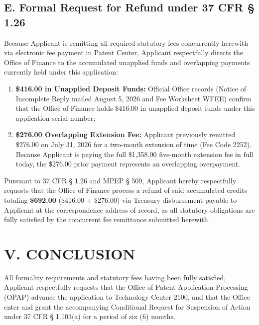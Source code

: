 \documentclass[11pt,letterpaper]{article}
\begin{document}
\subsection*{E. Formal Request for Refund under 37 CFR \S{} 1.26}
Because Applicant is remitting all required statutory fees concurrently herewith via electronic fee payment in Patent Center, Applicant respectfully directs the Office of Finance to the accumulated unapplied funds and overlapping payments currently held under this application:
\begin{enumerate}[leftmargin=*]
    \item \textbf{\$416.00 in Unapplied Deposit Funds:} Official Office records (Notice of Incomplete Reply mailed August 5, 2026 and Fee Worksheet WFEE) confirm that the Office of Finance holds \$416.00 in unapplied deposit funds under this application serial number;
    \item \textbf{\$276.00 Overlapping Extension Fee:} Applicant previously remitted \$276.00 on July 31, 2026 for a two-month extension of time (Fee Code 2252). Because Applicant is paying the full \$1,358.00 five-month extension fee in full today, the \$276.00 prior payment represents an overlapping overpayment.
\end{enumerate}

Pursuant to 37 CFR \S{} 1.26 and MPEP \S{} 509, Applicant hereby respectfully requests that the Office of Finance process a refund of said accumulated credits totaling \textbf{\$692.00} (\$416.00 + \$276.00) via Treasury disbursement payable to Applicant at the correspondence address of record, as all statutory obligations are fully satisfied by the concurrent fee remittance submitted herewith.

\section*{V. CONCLUSION}

All formality requirements and statutory fees having been fully satisfied, Applicant respectfully requests that the Office of Patent Application Processing (OPAP) advance the application to Technology Center 2100, and that the Office enter and grant the accompanying Conditional Request for Suspension of Action under 37 CFR \S{} 1.103(a) for a period of six (6) months.
\end{document}
